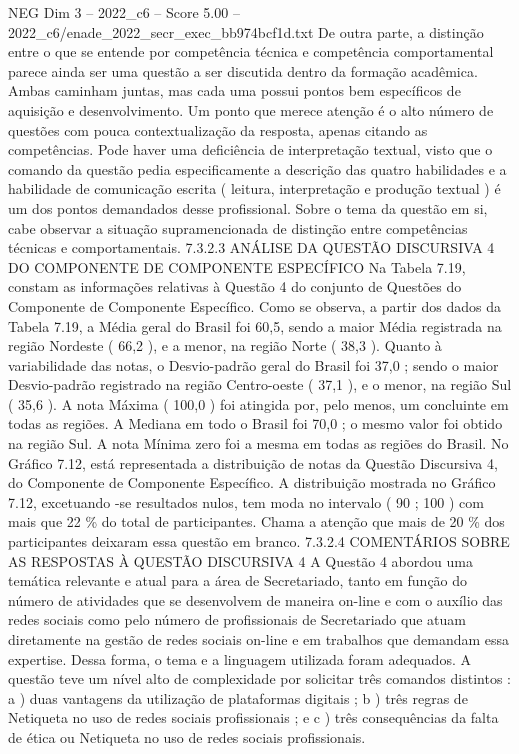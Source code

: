 \begin{textsample}{NEG Dim 3 – 2022\_c6 – Score 5.00 – 2022\_c6/enade\_2022\_secr\_exec\_bb974bcf1d.txt}
De outra parte, a distinção entre o que se entende por competência técnica e competência comportamental parece ainda ser uma questão a ser discutida dentro da formação acadêmica.
Ambas caminham juntas, mas cada uma possui pontos bem específicos de aquisição e desenvolvimento.
Um ponto que merece atenção é o alto número de questões com pouca contextualização da resposta, apenas citando as competências.
Pode haver uma deficiência de interpretação textual, visto que o comando da questão pedia especificamente a descrição das quatro habilidades e a habilidade de comunicação escrita ( leitura, interpretação e produção textual ) é um dos pontos demandados desse profissional.
Sobre o tema da questão em si, cabe observar a situação supramencionada de distinção entre competências técnicas e comportamentais. 7.3.2.3 ANÁLISE DA QUESTÃO DISCURSIVA 4 DO COMPONENTE DE COMPONENTE ESPECÍFICO Na Tabela 7.19, constam as informações relativas à Questão 4 do conjunto de Questões do Componente de Componente Específico.
Como se observa, a partir dos dados da Tabela 7.19, a Média geral do Brasil foi 60,5, sendo a maior Média registrada na região Nordeste ( 66,2 ), e a menor, na região Norte ( 38,3 ).
Quanto à variabilidade das notas, o Desvio-padrão geral do Brasil foi 37,0 ; sendo o maior Desvio-padrão registrado na região Centro-oeste ( 37,1 ), e o menor, na região Sul ( 35,6 ).
A nota Máxima ( 100,0 ) foi atingida por, pelo menos, um concluinte em todas as regiões.
A Mediana em todo o Brasil foi 70,0 ; o mesmo valor foi obtido na região Sul.
A nota Mínima zero foi a mesma em todas as regiões do Brasil.
No Gráfico 7.12, está representada a distribuição de notas da Questão Discursiva 4, do Componente de Componente Específico.
A distribuição mostrada no Gráfico 7.12, excetuando -se resultados nulos, tem moda no intervalo ( 90 ; 100 ) com mais que 22 \% do total de participantes.
Chama a atenção que mais de 20 \% dos participantes deixaram essa questão em branco. 7.3.2.4 COMENTÁRIOS SOBRE AS RESPOSTAS À QUESTÃO DISCURSIVA 4 A Questão 4 abordou uma temática relevante e atual para a área de Secretariado, tanto em função do número de atividades que se desenvolvem de maneira on-line e com o auxílio das redes sociais como pelo número de profissionais de Secretariado que atuam diretamente na gestão de redes sociais on-line e em trabalhos que demandam essa expertise.
Dessa forma, o tema e a linguagem utilizada foram adequados.
A questão teve um nível alto de complexidade por solicitar três comandos distintos : a ) duas vantagens da utilização de plataformas digitais ; b ) três regras de Netiqueta no uso de redes sociais profissionais ; e c ) três consequências da falta de ética ou Netiqueta no uso de redes sociais profissionais.

\end{textsample}
